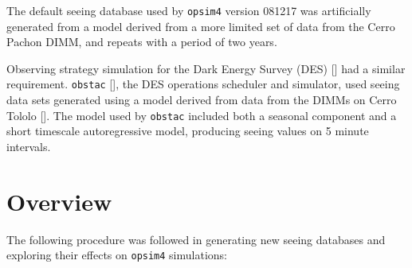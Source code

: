 \documentclass[\docopts]{\docclass}
\begin{document}
The default seeing database used by \texttt{opsim4} version 081217 was
artificially generated from a model derived from a more limited set of
data from the Cerro Pachon DIMM, and repeats with a period of two
years.

Observing strategy simulation for the Dark Energy Survey (DES)
[\cite{2016MNRAS.460.1270D}] had a similar
requirement. \texttt{obstac} [\cite{2014ASPC..485...77N}], the DES operations
scheduler and simulator, used seeing data sets generated using a model
derived from data from the DIMMs on Cerro
Tololo [\cite{2012ASPC..461..201N}]. The model used by \texttt{obstac} included
both a seasonal component and a short timescale autoregressive model,
producing seeing values on 5 minute intervals.



\section{Overview}
\label{sec:overview}

The following procedure was followed in generating new seeing
databases and exploring their effects on \texttt{opsim4} simulations:
\end{document}
